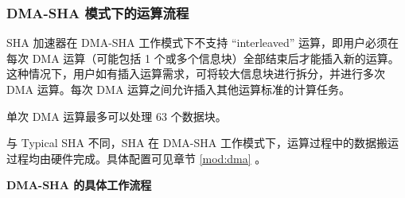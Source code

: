 \documentclass[main\_\_CN.tex]{subfiles}
\begin{document}
\subsubsection{DMA-SHA 模式下的运算流程}\label{sec:sha-dma-sha}

\chipname{} SHA 加速器在 DMA-SHA 工作模式下不支持 “interleaved” 运算，即用户必须在每次 DMA 运算（可能包括 1 个或多个信息块）全部结束后才能插入新的运算。这种情况下，用户如有插入运算需求，可将较大信息块进行拆分，并进行多次 DMA 运算。每次 DMA 运算之间允许插入其他运算标准的计算任务。

单次 DMA 运算最多可以处理 63 个数据块。


与 Typical SHA 不同，SHA 在 DMA-SHA 工作模式下，运算过程中的数据搬运过程均由硬件完成。具体配置可见章节 \ref{mod:dma} \textit{}。

\textbf{DMA-SHA 的具体工作流程}
\end{document}
